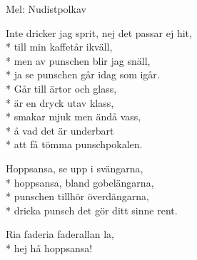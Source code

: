 \begin{SongText}[Punschpolkett]
    \begin{SongInfo}
        Mel: Nudistpolkav
    \end{SongInfo}
    \begin{SongVerse}
        Inte dricker jag sprit, nej det passar ej hit,\\*%
        till min kaffetår ikväll,\\*%
        men av punschen blir jag snäll,\\*%
        ja se punschen går idag som igår.\\*%
        Går till ärtor och glass,\\*%
        är en dryck utav klass,\\*%
        smakar mjuk men ändå vass,\\*%
        å vad det är underbart\\*%
        att få tömma punschpokalen.
    \end{SongVerse}
    \begin{SongVerse}
        Hoppsansa, se upp i svängarna,\\*%
        hoppsansa, bland gobelängarna,\\*%
        punschen tillhör överdängarna,\\*%
        dricka punsch det gör ditt sinne rent.
    \end{SongVerse}
    \begin{SongVerse}
        Ria faderia faderallan la,\\*%
        hej hå hoppsansa!
    \end{SongVerse}
\end{SongText}